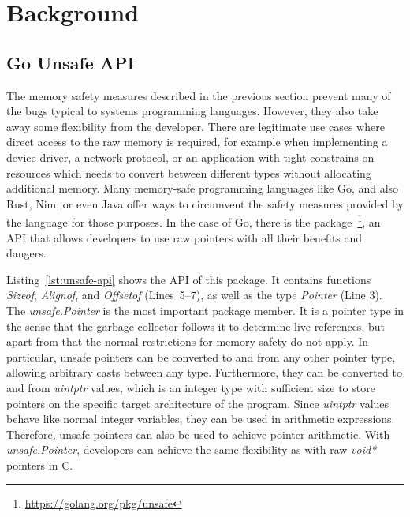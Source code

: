 
\chapter{Background}\label{ch:background}



\section{Go Unsafe API}\label{sec:background:unsafe-api}

The memory safety measures described in the previous section prevent many of the bugs typical to systems programming
languages.
However, they also take away some flexibility from the developer.
There are legitimate use cases where direct access to the raw memory is required, for example when implementing a
device driver, a network protocol, or an application with tight constrains on resources which needs to convert between
different types without allocating additional memory.
Many memory-safe programming languages like Go, and also Rust, Nim, or even Java offer ways to circumvent the safety
measures provided by the language for those purposes.
In the case of Go, there is the \unsafe{} package~\footnote{\url{https://golang.org/pkg/unsafe}}, an \acrshort{API} that
allows developers to use raw pointers with all their benefits and dangers.



Listing~\ref{lst:unsafe-api} shows the \acrshort{API} of this package.
It contains  functions \textit{Sizeof}, \textit{Alignof}, and \textit{Offsetof} (Lines~5--7),
as well as the type \textit{Pointer} (Line 3).
The \textit{unsafe.Pointer} is the most important package member.
It is a pointer type in the sense that the garbage collector follows it to determine live references, but apart from
that the normal restrictions for memory safety do not apply.
In particular, unsafe pointers can be converted to and from any other pointer type, allowing arbitrary casts between
any type.
Furthermore, they can be converted to and from \textit{uintptr} values, which is an integer type with sufficient size
to store pointers on the specific target architecture of the program.
Since \textit{uintptr} values behave like normal integer variables, they can be used in arithmetic expressions.
Therefore, unsafe pointers can also be used to achieve pointer arithmetic.
With \textit{unsafe.Pointer}, developers can achieve the same flexibility as with raw \textit{void*} pointers in C.

